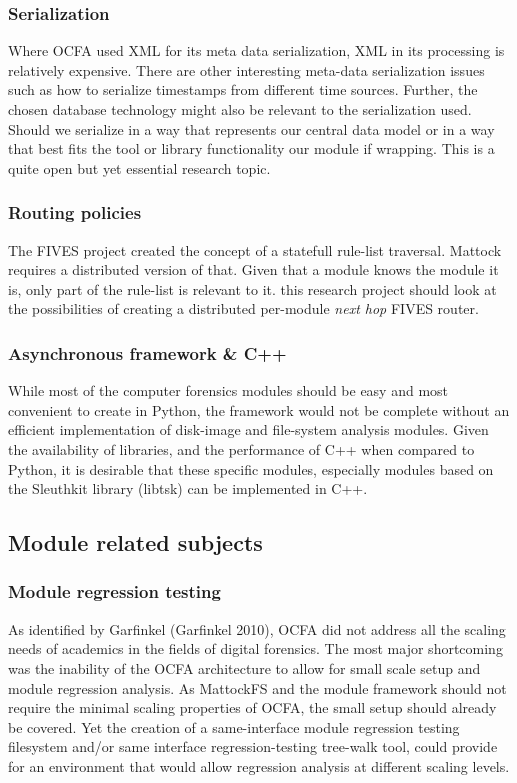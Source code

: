\subsubsection{Serialization}
Where OCFA used XML for its meta data serialization, XML in its processing is relatively expensive. There are other interesting meta-data serialization issues such as how to serialize timestamps from different time sources. Further, the chosen database technology might also be relevant to the serialization used. Should we serialize in a way that represents our central data model or in a way that best fits the tool or library functionality our module if wrapping. This is a quite open but yet essential research topic. 
\subsubsection{Routing policies}
The FIVES project created the concept of a statefull rule-list traversal. Mattock requires a distributed version of that. Given that a module knows the module it is, only part of the rule-list is relevant to it. this research project should look at the possibilities of creating a distributed per-module \emph{next hop} FIVES router.
\subsubsection{Asynchronous framework \& C++}
While most of the computer forensics modules should be easy and most convenient to create in Python, the framework would not be complete without an efficient implementation of disk-image and file-system analysis modules. Given the availability of libraries, and the performance of C++ when compared to Python, it is desirable that these specific modules, especially modules based on the Sleuthkit library (libtsk) can be implemented in C++.  
\subsection{Module related subjects}
\subsubsection{Module regression testing}
As identified by Garfinkel (Garfinkel 2010), OCFA did not address all the scaling needs of academics in the fields of digital forensics. The most major shortcoming was the inability of the OCFA architecture to allow for small scale setup and module regression analysis. As MattockFS and the module framework should not require the minimal scaling properties of OCFA, the small setup should already be covered. Yet the creation of a same-interface module regression testing filesystem and/or same interface regression-testing tree-walk tool, could provide for an environment that would allow regression analysis at different scaling levels.
